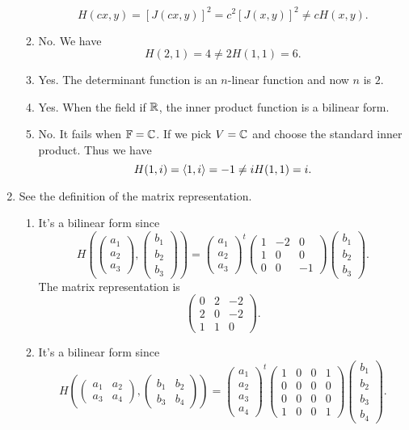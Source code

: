 \begin{enumerate}
\begin{enumerate}
\[H(cx,y)=[J(cx,y)]^2=c^2[J(x,y)]^2\neq cH(x,y).\]
\item No. We have 
\[H(2,1)=4\neq 2H(1,1)=6.\]
\item Yes. The determinant function is an $n$-linear function and now $n$ is $2$.
\item Yes. When the field if $\mathbb{R}$, the inner product function is a bilinear form.
\item No. It fails when $\mathbb{F}=\mathbb{C}$. If we pick $V=\mathbb{C}$ and choose the standard inner product. Thus we have 
\[H(1,i)=\langle 1,i\rangle=-1\neq iH(1,1)=i.\]
\end{enumerate}
\item See the definition of the matrix representation. \begin{enumerate}
\item It's a bilinear form since 
\[H\left(\begin{pmatrix}a_1\\a_2\\a_3\end{pmatrix},\begin{pmatrix}b_1\\b_2\\b_3\end{pmatrix}\right)=\begin{pmatrix}a_1\\a_2\\a_3\end{pmatrix}^t\begin{pmatrix}1&-2&0\\1&0&0\\0&0&-1\end{pmatrix}\begin{pmatrix}b_1\\b_2\\b_3\end{pmatrix}.\]
The matrix representation is 
\[\begin{pmatrix}0&2&-2\\2&0&-2\\1&1&0\end{pmatrix}.\]
\item It's a bilinear form since 
\[H\left(\begin{pmatrix}a_1&a_2\\a_3&a_4\end{pmatrix},\begin{pmatrix}b_1&b_2\\b_3&b_4\end{pmatrix}\right)=\begin{pmatrix}a_1\\a_2\\a_3\\a_4\end{pmatrix}^t\begin{pmatrix}1&0&0&1\\0&0&0&0\\0&0&0&0\\1&0&0&1\end{pmatrix}\begin{pmatrix}b_1\\b_2\\b_3\\b_4\end{pmatrix}.\]

\end{enumerate}
\end{enumerate}
